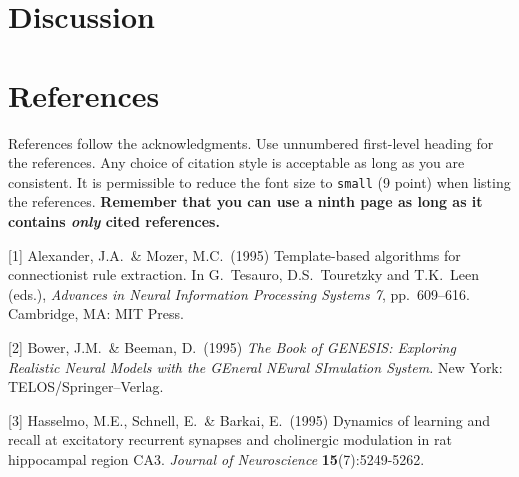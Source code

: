\documentclass{article}
\begin{document}






\section{Discussion}



\section*{References}

References follow the acknowledgments. Use unnumbered first-level
heading for the references. Any choice of citation style is acceptable
as long as you are consistent. It is permissible to reduce the font
size to \verb+small+ (9 point) when listing the references. {\bf
  Remember that you can use a ninth page as long as it contains
  \emph{only} cited references.}
\medskip

\small

[1] Alexander, J.A.\ \& Mozer, M.C.\ (1995) Template-based algorithms
for connectionist rule extraction. In G.\ Tesauro, D.S.\ Touretzky and
T.K.\ Leen (eds.), {\it Advances in Neural Information Processing
  Systems 7}, pp.\ 609--616. Cambridge, MA: MIT Press.

[2] Bower, J.M.\ \& Beeman, D.\ (1995) {\it The Book of GENESIS:
  Exploring Realistic Neural Models with the GEneral NEural SImulation
  System.}  New York: TELOS/Springer--Verlag.

[3] Hasselmo, M.E., Schnell, E.\ \& Barkai, E.\ (1995) Dynamics of
learning and recall at excitatory recurrent synapses and cholinergic
modulation in rat hippocampal region CA3. {\it Journal of
  Neuroscience} {\bf 15}(7):5249-5262.
\end{document}
